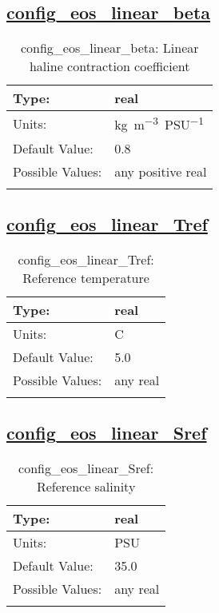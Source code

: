 \subsection[config\_eos\_linear\_beta]{\hyperref[sec:nm_tab_eos_linear]{config\_eos\_linear\_beta}}
\label{subsec:nm_sec_config_eos_linear_beta}
\begin{center}
\begin{longtable}{| p{2.0in} || p{4.0in} |}
    \hline
    Type: & real \\
    \hline
    Units: & \si{kg.m^{-3}.PSU^{-1}} \\
    \hline
    Default Value: & 0.8 \\
    \hline
    Possible Values: & any positive real \\
    \hline
    \caption{config\_eos\_linear\_beta: Linear haline contraction coefficient}
\end{longtable}
\end{center}
\subsection[config\_eos\_linear\_Tref]{\hyperref[sec:nm_tab_eos_linear]{config\_eos\_linear\_Tref}}
\label{subsec:nm_sec_config_eos_linear_Tref}
\begin{center}
\begin{longtable}{| p{2.0in} || p{4.0in} |}
    \hline
    Type: & real \\
    \hline
    Units: & \si{C} \\
    \hline
    Default Value: & 5.0 \\
    \hline
    Possible Values: & any real \\
    \hline
    \caption{config\_eos\_linear\_Tref: Reference temperature}
\end{longtable}
\end{center}
\subsection[config\_eos\_linear\_Sref]{\hyperref[sec:nm_tab_eos_linear]{config\_eos\_linear\_Sref}}
\label{subsec:nm_sec_config_eos_linear_Sref}
\begin{center}
\begin{longtable}{| p{2.0in} || p{4.0in} |}
    \hline
    Type: & real \\
    \hline
    Units: & \si{PSU} \\
    \hline
    Default Value: & 35.0 \\
    \hline
    Possible Values: & any real \\
    \hline
    \caption{config\_eos\_linear\_Sref: Reference salinity}
\end{longtable}
\end{center}
